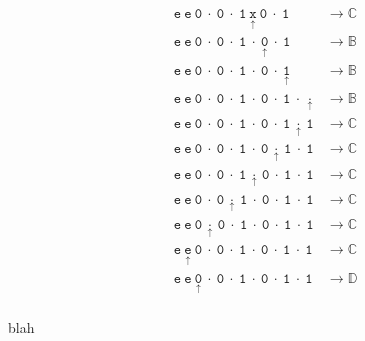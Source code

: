 \documentclass[Master.tex]{subfiles}
\begin{document}
\begin{equation*}
\begin{aligned}
&\mathtt{e\ e\ 0\ \cdot\ 0\ \cdot\ 1\ \underset{\uparrow}{x}\ 0\ \cdot\ 1} & \rightarrow \mathbb{C}\\
&\mathtt{e\ e\ 0\ \cdot\ 0\ \cdot\ 1\ \cdot\ \underset{\uparrow}{0}\ \cdot\ 1} & \rightarrow \mathbb{B}\\
&\mathtt{e\ e\ 0\ \cdot\ 0\ \cdot\ 1\ \cdot\ 0\ \cdot\ \underset{\uparrow}{1}} & \rightarrow \mathbb{B}\\
&\mathtt{e\ e\ 0\ \cdot\ 0\ \cdot\ 1\ \cdot\ 0\ \cdot\ 1\ \cdot\ \underset{\uparrow}{\cdot}} & \rightarrow \mathbb{B}\\
&\mathtt{e\ e\ 0\ \cdot\ 0\ \cdot\ 1\ \cdot\ 0\ \cdot\ 1\ \underset{\uparrow}{\cdot}\ 1} & \rightarrow \mathbb{C}\\
&\mathtt{e\ e\ 0\ \cdot\ 0\ \cdot\ 1\ \cdot\ 0\ \underset{\uparrow}{\cdot}\ 1\ \cdot\ 1} & \rightarrow \mathbb{C}\\
&\mathtt{e\ e\ 0\ \cdot\ 0\ \cdot\ 1\ \underset{\uparrow}{\cdot}\ 0\ \cdot\ 1\ \cdot\ 1} & \rightarrow \mathbb{C}\\
&\mathtt{e\ e\ 0\ \cdot\ 0\ \underset{\uparrow}{\cdot}\ 1\ \cdot\ 0\ \cdot\ 1\ \cdot\ 1} & \rightarrow \mathbb{C}\\
&\mathtt{e\ e\ 0\ \underset{\uparrow}{\cdot}\ 0\ \cdot\ 1\ \cdot\ 0\ \cdot\ 1\ \cdot\ 1} & \rightarrow \mathbb{C}\\
&\mathtt{e\ \underset{\uparrow}{e}\ 0\ \cdot\ 0\ \cdot\ 1\ \cdot\ 0\ \cdot\ 1\ \cdot\ 1} & \rightarrow \mathbb{C}\\
&\mathtt{e\ e\ \underset{\uparrow}{0}\ \cdot\ 0\ \cdot\ 1\ \cdot\ 0\ \cdot\ 1\ \cdot\ 1} & \rightarrow \mathbb{D}\\
\end{aligned}
\end{equation*}

blah
\end{document}
